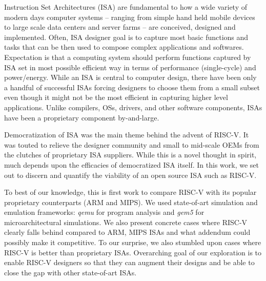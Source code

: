 

Instruction Set Architectures (ISA) are fundamental to how a wide variety of modern days computer systems -- ranging from simple hand held mobile devices to large scale data centers and server farms -- are conceived, designed and implemented. Often, ISA designer goal is to capture most basic functions and tasks that can be then used to compose complex applications and softwares. Expectation is that a computing system should perform functions captured by ISA set in most possible efficient way in terms of performance (single-cycle) and power/energy. While an ISA is central to computer design, there have been only a handful of successful ISAs forcing designers to choose them from a small subset even though it might not be the most efficient in capturing higher level applications. Unlike compilers, OSs, drivers, and other software components, ISAs have been a proprietary component by-and-large.

Democratization of ISA was the main theme behind the advent of RISC-V. It was touted to relieve the designer community and small to mid-scale OEMs from the clutches of proprietary ISA suppliers. While this is a novel thought in spirit, much depends upon the efficacies of democratized ISA itself. In this work, we set out to discern and quantify the viability of an open source ISA such as RISC-V. 

To best of our knowledge, this is first work to compare RISC-V with its popular proprietary counterparts (ARM and MIPS). We used state-of-art simulation and emulation frameworks: \textit{qemu} for program analysis and \textit{gem5} for microarchitectural simulations. We also present concrete cases where RISC-V clearly falls behind compared to ARM, MIPS ISAs and what addendum could possibly make it competitive. To our surprise, we also stumbled upon cases where RISC-V is better than proprietary ISAs. Overarching goal of our exploration is to enable RISC-V designers so that they can augment their designs and be able to close the gap with other state-of-art ISAs.



